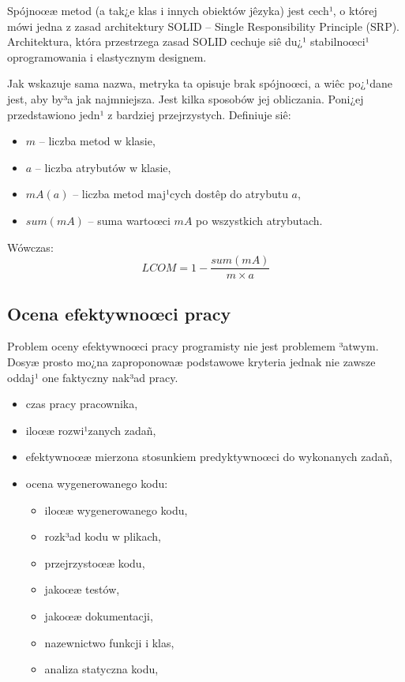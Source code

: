 Spójnoœæ metod (a tak¿e klas i innych obiektów jêzyka) jest cech¹, o której mówi jedna z zasad
architektury SOLID -- Single Responsibility Principle (SRP). Architektura, która przestrzega zasad
SOLID cechuje siê du¿¹ stabilnoœci¹ oprogramowania i elastycznym designem\cite{book:agile}.

Jak wskazuje sama nazwa, metryka ta opisuje brak spójnoœci, a wiêc po¿¹dane jest, aby by³a jak
najmniejsza. Jest kilka sposobów jej obliczania. Poni¿ej przedstawiono jedn¹ z bardziej przejrzystych. Definiuje siê:
\begin{itemize}
    \item $m$ -- liczba metod w klasie,
    \item $a$ -- liczba atrybutów w klasie,
    \item $mA(a)$ -- liczba metod maj¹cych dostêp do atrybutu $a$,
    \item $sum(mA)$ -- suma wartoœci $mA$ po wszystkich atrybutach.
\end{itemize}
Wówczas:
\begin{equation*}
    LCOM = 1 - \frac{sum(mA)}{m \times a}
\end{equation*}

\subsection{Ocena efektywnoœci pracy}
\label{subsec:ocenaEfektywnosci}
Problem oceny efektywnoœci pracy programisty nie jest problemem ³atwym. Dosyæ prosto mo¿na
zaproponowaæ podstawowe kryteria jednak nie zawsze oddaj¹ one faktyczny nak³ad pracy. 

\begin{itemize}
	\item czas pracy pracownika,
	\item iloœæ rozwi¹zanych zadañ,
	\item efektywnoœæ mierzona stosunkiem predyktywnoœci do wykonanych zadañ,
	\item ocena wygenerowanego kodu:
	\begin{itemize}
		\item iloœæ wygenerowanego kodu,
		\item rozk³ad kodu w plikach,
		\item przejrzystoœæ kodu,
		\item jakoœæ testów,
		\item jakoœæ dokumentacji,
		\item nazewnictwo funkcji i klas,
		\item analiza statyczna kodu,
	\end{itemize}
\end{itemize}



